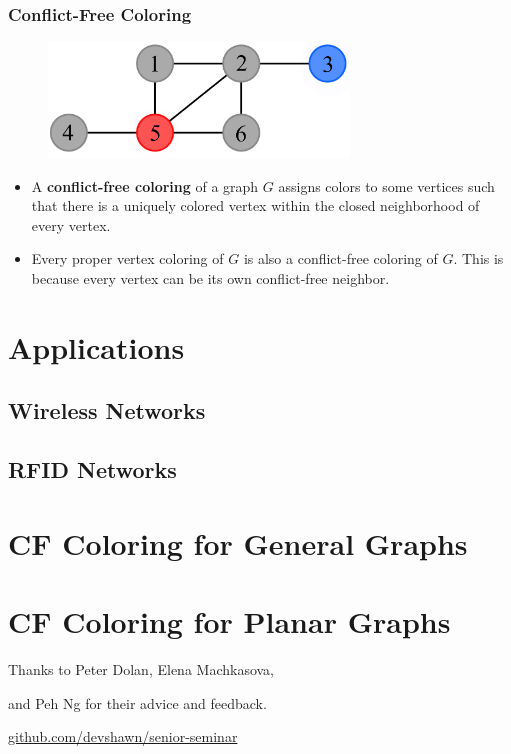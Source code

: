 \documentclass[xcolor=dvipsnames,aspectratio=1610]{beamer}
\begin{document}
  \begin{frame}
    \frametitle{Conflict-Free Coloring}

    \begin{figure}[h]
      \centering
      \includegraphics[width=8cm]{../figures/example-cfcp.pdf}
    \end{figure}


    \begin{itemize}
      \item A \textbf{conflict-free coloring} of a graph $G$ assigns colors to some vertices such that there is a uniquely colored vertex within the closed neighborhood of every vertex.
      \item Every proper vertex coloring of $G$ is also a conflict-free coloring of $G$. This is because every vertex can be its own conflict-free neighbor.
    \end{itemize}
  \end{frame}


  \section{Applications}

  \subsection{Wireless Networks}

  \subsection{RFID Networks}



  \section{CF Coloring for General Graphs}

  \section{CF Coloring for Planar Graphs}

  \begin{frame}[standout]
    \centering
    {Thanks to Peter Dolan, Elena Machkasova,

    and Peh Ng for their advice and feedback.}
    \vfill
    \href{https://github.com/devshawn/senior-seminar}{github.com/devshawn/senior-seminar}
    \vfill
    \ccbyncsa{}
  \end{frame}
\end{document}
